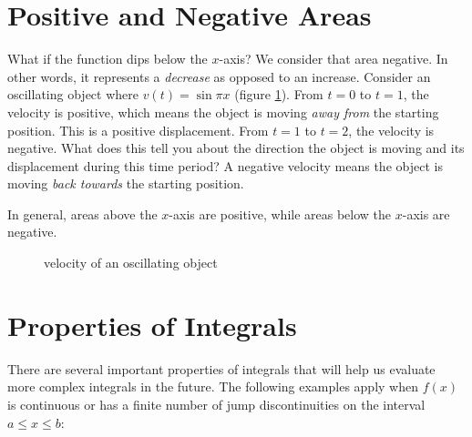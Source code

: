 \section{Positive and Negative Areas}
What if the function dips below the $x$-axis? We consider that area 
negative. In other words, it represents a \textit{decrease} as opposed to 
an increase. Consider an oscillating object where $v(t) = 
\sin{\pi x}$ (figure \ref{fig:oscillate}). From $t = 0$ to $t = 1$, 
the velocity is positive, which means the object is moving 
\textit{away from} the starting position. This is a positive 
displacement. From $t = 1$ to $t = 2$, the velocity is negative. What 
does this tell you about the direction the object is moving and its 
displacement during this time period? A negative velocity means the 
object is moving \textit{back towards} the starting position.

In general, areas above the $x$-axis are positive, while areas below 
the $x$-axis are negative.

\begin{figure}[htbp]
	\caption{velocity of an oscillating object}
	\label{fig:oscillate}
\end{figure}

\section{Properties of Integrals}
There are several important properties of integrals that will help us 
evaluate more complex integrals in the future. The following examples 
apply when $f(x)$ is continuous or has a finite number of jump 
discontinuities on the interval $a \leq x \leq b$:

